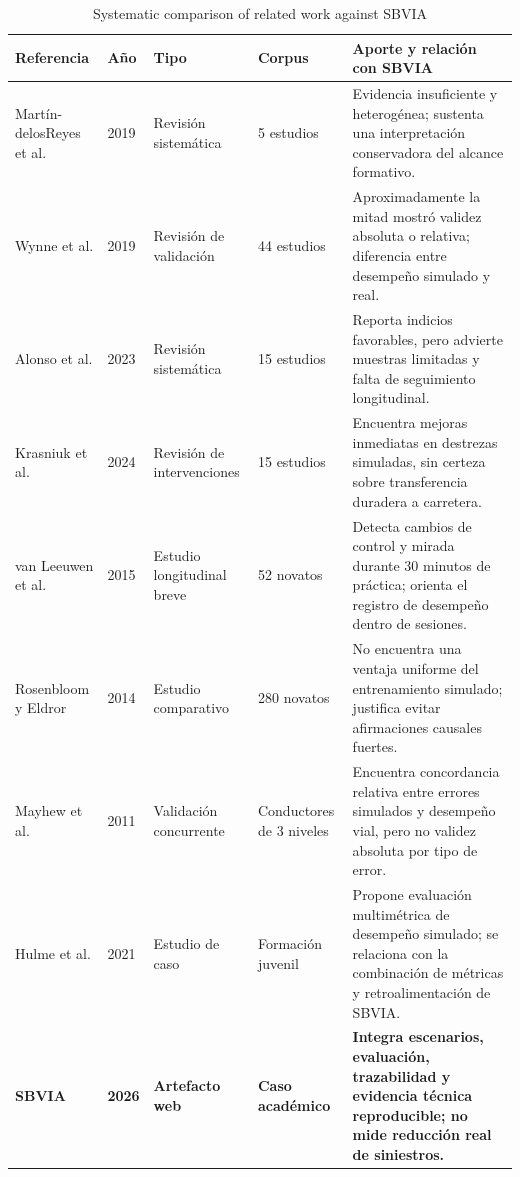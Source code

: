 \documentclass[11pt,a4paper]{report}
\begin{document}
\begin{table}[htbp]
\centering
\caption{Systematic comparison of related work against SBVIA}
\label{tab:trabajos_relacionados}
\footnotesize
\begin{tabularx}{\textwidth}{p{2.8cm}p{1cm}p{2.4cm}p{2.2cm}X}
\toprule
\textbf{Referencia} & \textbf{Año} & \textbf{Tipo} & \textbf{Corpus} & \textbf{Aporte y relación con SBVIA} \\
\midrule
Martín-delosReyes et al. \cite{martin2019simulator} & 2019 & Revisión sistemática & 5 estudios & Evidencia insuficiente y heterogénea; sustenta una interpretación conservadora del alcance formativo. \\
Wynne et al. \cite{wynne2019validation} & 2019 & Revisión de validación & 44 estudios & Aproximadamente la mitad mostró validez absoluta o relativa; diferencia entre desempeño simulado y real. \\
Alonso et al. \cite{alonso2023simulators} & 2023 & Revisión sistemática & 15 estudios & Reporta indicios favorables, pero advierte muestras limitadas y falta de seguimiento longitudinal. \\
Krasniuk et al. \cite{krasniuk2024simulator} & 2024 & Revisión de intervenciones & 15 estudios & Encuentra mejoras inmediatas en destrezas simuladas, sin certeza sobre transferencia duradera a carretera. \\
van Leeuwen et al. \cite{vanleeuwen2015changes} & 2015 & Estudio longitudinal breve & 52 novatos & Detecta cambios de control y mirada durante 30 minutos de práctica; orienta el registro de desempeño dentro de sesiones. \\
Rosenbloom y Eldror \cite{rosenbloom2014workshops} & 2014 & Estudio comparativo & 280 novatos & No encuentra una ventaja uniforme del entrenamiento simulado; justifica evitar afirmaciones causales fuertes. \\
Mayhew et al. \cite{mayhew2011validation} & 2011 & Validación concurrente & Conductores de 3 niveles & Encuentra concordancia relativa entre errores simulados y desempeño vial, pero no validez absoluta por tipo de error. \\
Hulme et al. \cite{hulme2021blueprint} & 2021 & Estudio de caso & Formación juvenil & Propone evaluación multimétrica de desempeño simulado; se relaciona con la combinación de métricas y retroalimentación de SBVIA. \\
\textbf{SBVIA} & \textbf{2026} & \textbf{Artefacto web} & \textbf{Caso académico} & \textbf{Integra escenarios, evaluación, trazabilidad y evidencia técnica reproducible; no mide reducción real de siniestros.} \\
\bottomrule
\end{tabularx}
\end{table}
\end{document}
